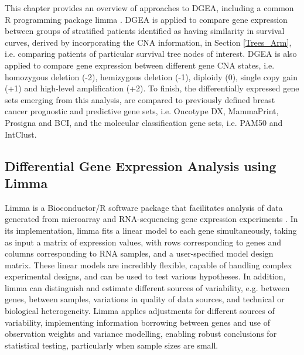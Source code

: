 This chapter provides an overview of approaches to DGEA, including a common R programming package limma \citep{pmid25605792}. DGEA is applied to compare gene expression between groups of stratified patients identified as having similarity in survival curves, derived by incorporating the CNA information, in Section \ref{Trees_Arm}, i.e. comparing patients of particular survival tree nodes of interest. DGEA is also applied to compare gene expression between different gene CNA states, i.e. homozygous deletion (-2), hemizygous deletion (-1), diploidy (0), single copy gain (+1) and high-level amplification (+2). To finish, the differentially expressed gene sets emerging from this analysis, are compared to previously defined breast cancer prognostic and predictive gene sets, i.e. Oncotype DX, MammaPrint, Prosigna and BCI, and the molecular classification gene sets, i.e. PAM50 and IntClust. 

\subsection{Differential Gene Expression Analysis using Limma}
Limma is a Bioconductor/R software package that facilitates analysis of data generated from microarray and RNA-sequencing gene expression experiments \citep{pmid25605792}. In its implementation, limma fits a linear model to each gene simultaneously, taking as input a matrix of expression values, with rows corresponding to genes and columns corresponding to RNA samples, and a user-specified model design matrix. These linear models are incredibly flexible, capable of handling complex experimental designs, and can be used to test various hypotheses. In addition, limma can distinguish and estimate different sources of variability, e.g. between genes, between samples, variations in quality of data sources, and technical or biological heterogeneity. Limma applies adjustments for different sources of variability, implementing information borrowing between genes and use of observation weights and variance modelling, enabling robust conclusions for statistical testing, particularly when sample sizes are small. 

